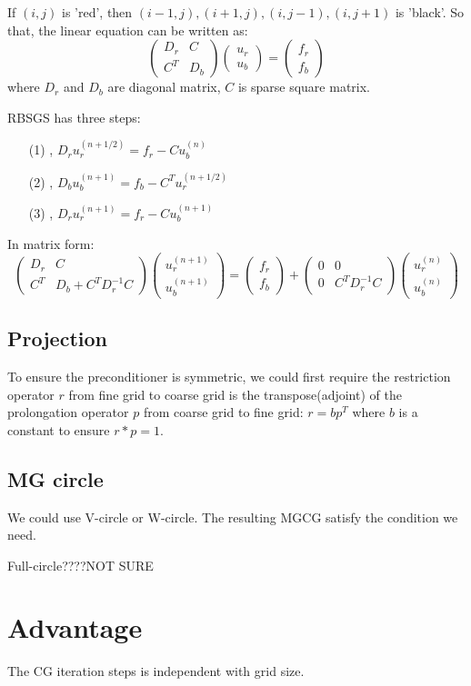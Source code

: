 \documentclass{article}
\begin{document}
If $(i,j)$ is 'red', then $(i-1,j),(i+1,j),(i,j-1),(i,j+1)$ is 'black'.
So that, the linear equation can be written as:
\begin{equation}
\left(
\begin{array}{cc}
D_r & C\\
C^T & D_b
\end{array}
\right)\left(
\begin{array}{c}
u_r\\
u_b
\end{array}
\right)=\left(
\begin{array}{c}
f_r\\
f_b
\end{array}
\right)
\end{equation}
where $D_r$ and $D_b$ are diagonal matrix, $C$ is sparse square matrix.

RBSGS has three steps:
\begin{itemize}
\item[(1)], $D_r u_r^{(n+1/2)} = f_r - C u^{(n)}_b$
\item[(2)], $D_b u_b^{(n+1)} = f_b - C^T u^{(n+1/2)}_r$
\item[(3)], $D_r u_r^{(n+1)} = f_r - C u^{(n+1)}_b$
\end{itemize}
In matrix form:
\begin{equation}
\left(
\begin{array}{cc}
D_r & C\\
C^T & D_b+C^TD_r^{-1}C
\end{array}
\right)\left(
\begin{array}{c}
u_r^{(n+1)}\\
u_b^{(n+1)}
\end{array}
\right)=\left(
\begin{array}{c}
f_r\\
f_b
\end{array}
\right)+\left(\begin{array}{cc}
0 & 0\\
0 & C^TD_r^{-1}C
\end{array}
\right)\left(
\begin{array}{c}
u_r^{(n)}\\
u_b^{(n)}
\end{array}
\right)
\end{equation}

\subsection{Projection}
To ensure the preconditioner is symmetric, we could first require the restriction operator $r$ from fine grid to coarse grid is the transpose(adjoint) of the prolongation operator $p$ from coarse grid to fine grid: $r=b p^T$ where $b$ is a constant to ensure $r*p=1$.

\subsection{MG circle}
We could use V-circle or W-circle. The resulting MGCG satisfy the condition we need.

Full-circle????NOT SURE


\section{Advantage}
The CG iteration steps is independent with grid size. 
\end{document}
